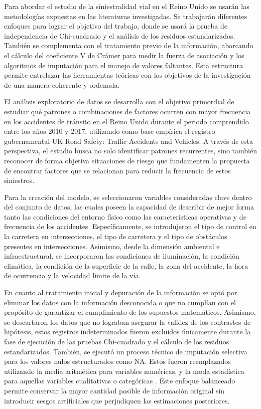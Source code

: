 \documentclass[11pt]{article}
\begin{document}
Para abordar el estudio de la siniestralidad vial en el Reino 
Unido se usarán las metodologías expuestas en las literaturas investigadas. 
Se trabajarán diferentes enfoques para lograr el objetivo del trabajo, donde 
se usará la prueba de independencia de Chi-cuadrado y el análisis de los residuos 
estandarizados. También se complementa con el tratamiento previo de la información, 
abarcando el cálculo del coeficiente V de Crámer para medir la fuerza de asociación y 
los algoritmos de imputación para el manejo de valores faltantes. 
Esta estructura permite entrelazar las herramientas teóricas con los objetivos de 
la investigación de una manera coherente y ordenada.

El análisis exploratorio de datos se desarrolla con el objetivo 
primordial de estudiar qué patrones o combinaciones de factores ocurren 
con mayor frecuencia en los accidentes de tránsito en el Reino Unido durante 
el periodo comprendido entre los años 2010 y 2017, utilizando como base empírica 
el registro gubernamental UK Road Safety: Traffic Accidents and Vehicles. A través 
de esta perspectiva, el estudio busca no solo identificar patrones recurrentes, sino 
también reconocer de forma objetiva situaciones de riesgo que fundamenten la propuesta 
de encontrar factores que se relacionan para reducir la frecuencia de estos siniestros.

Para la creación del modelo, se seleccionaron variables consideradas clave dentro 
del conjunto de datos, las cuales poseen la capacidad de describir de mejor forma 
tanto las condiciones del entorno físico como las características operativas y de 
frecuencia de los accidentes. Específicamente, se introdujeron el tipo de control 
en la carretera en intersecciones, el tipo de carretera y el tipo de obstáculos 
presentes en intersecciones. Asimismo, desde la dimensión ambiental e infraestructural, 
se incorporaron las condiciones de iluminación, la condición 
climática, la condición de la superficie de la calle, la zona del accidente, la hora de ocurrencia 
y la velocidad límite de la vía.

En cuanto al tratamiento inicial y depuración de la información se optó por 
eliminar los datos con la información desconocida o que no cumplían con el 
propósito de garantizar el cumplimiento de los supuestos matemáticos. Asimismo, se descartaron los datos que 
no lograban asegurar la validez de los contrastes de hipótesis, estos registros indeterminados fueron 
excluidos únicamente durante la fase de ejecución de las pruebas 
Chi-cuadrado y el cálculo de los residuos estandarizados. También, se ejecutó un proceso 
técnico de imputación selectiva para los valores nulos estructurados como NA. Estos fueron 
reemplazados utilizando la media aritmética para variables numéricas, y la moda estadística 
para aquellas variables cualitativas o categóricas \parencite{USECHE2006}. 
Este enfoque balanceado permite conservar la mayor cantidad posible de información 
original sin introducir sesgos artificiales que perjudiquen las estimaciones posteriores.
\end{document}
